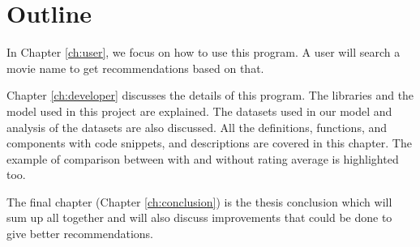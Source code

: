 \section{Outline}


In Chapter \ref{ch:user}, we focus on how to use this program. A user will search a movie name to get recommendations based on that.

Chapter \ref{ch:developer} discusses the details of this program. The libraries and the model used in this project are explained. The datasets used in our model and analysis of the datasets are also discussed. All the definitions, functions, and components with code snippets, and descriptions are covered in this chapter. The example of comparison between with and without rating average is highlighted too.   

The final chapter (Chapter \ref{ch:conclusion}) is the thesis conclusion which will sum up all together and will also discuss improvements that could be done to give better recommendations.


